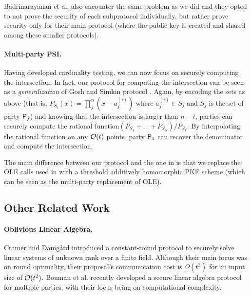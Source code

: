 Badrinarayanan et al. \cite{PKC:BMRR21} also encounter the same problem as we did and they opted to not prove the security of each subprotocol individually, but rather prove security only for their main protocol (where the public key is created and shared among these smaller protocols).

\paragraph{Multi-party PSI.}  Having developed cardinality testing, we can now focus on securely computing the intersection. In fact, our protocol for computing the intersection can be seen as a \emph{generalization} of Gosh and Simkin protocol \cite{C:GhoSim19}. Again, by encoding the sets as above  (that is, $P_{S_i}(x)=\prod_j^n (x-a^{(i)}_j)$ where $a^{(i)}_j\in S_j$ and $S_j$ is the set of party $\mathsf{P}_j$) and knowing that the intersection is larger than $n-t$, parties can securely compute the rational function\footnotemark $(P_{S_1}+\dots + P_{S_N})/P_{S_1}$. By interpolating the rational function on any $\mathcal{O}(t)$ points, party $\mathsf{P}_1$ can recover the denominator and compute the intersection.


The main difference between our protocol and the one in \cite{C:GhoSim19} is that we replace the OLE calls used in \cite{C:GhoSim19} with a threshold additively homomorphic PKE scheme (which can be seen as the multi-party replacement of OLE).



\subsection{Other Related Work}
\paragraph{Oblivious Linear Algebra.} Cramer and Damgård \cite{C:CraDam01} introduced a constant-round protocol to securely solve linear systems of unknown rank over a finite field. Although their main focus was on round optimality, their proposal's communication cost is $\Omega(t^3)$ for an input size of $\mathcal{O}(t^2)$. Bouman et al. \cite{Bouman2018NewPF} recently developed a secure linear algebra protocol for multiple parties, with their focus being on computational complexity.

